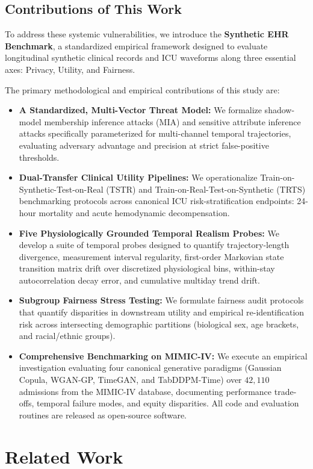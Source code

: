 \documentclass[journal]{IEEEtran}
\begin{document}
\subsection{Contributions of This Work}
To address these systemic vulnerabilities, we introduce the \textbf{Synthetic EHR Benchmark}, a standardized empirical framework designed to evaluate longitudinal synthetic clinical records and ICU waveforms along three essential axes: Privacy, Utility, and Fairness.

The primary methodological and empirical contributions of this study are:
\begin{itemize}
    \item \textbf{A Standardized, Multi-Vector Threat Model:} We formalize shadow-model membership inference attacks (MIA) and sensitive attribute inference attacks specifically parameterized for multi-channel temporal trajectories, evaluating adversary advantage and precision at strict false-positive thresholds.
    \item \textbf{Dual-Transfer Clinical Utility Pipelines:} We operationalize Train-on-Synthetic-Test-on-Real (TSTR) and Train-on-Real-Test-on-Synthetic (TRTS) benchmarking protocols across canonical ICU risk-stratification endpoints: 24-hour mortality and acute hemodynamic decompensation.
    \item \textbf{Five Physiologically Grounded Temporal Realism Probes:} We develop a suite of temporal probes designed to quantify trajectory-length divergence, measurement interval regularity, first-order Markovian state transition matrix drift over discretized physiological bins, within-stay autocorrelation decay error, and cumulative multiday trend drift.
    \item \textbf{Subgroup Fairness Stress Testing:} We formulate fairness audit protocols that quantify disparities in downstream utility and empirical re-identification risk across intersecting demographic partitions (biological sex, age brackets, and racial/ethnic groups).
    \item \textbf{Comprehensive Benchmarking on MIMIC-IV:} We execute an empirical investigation evaluating four canonical generative paradigms (Gaussian Copula, WGAN-GP, TimeGAN, and TabDDPM-Time) over $42,110$ admissions from the MIMIC-IV database, documenting performance trade-offs, temporal failure modes, and equity disparities. All code and evaluation routines are released as open-source software.
\end{itemize}

\section{Related Work}
\end{document}

